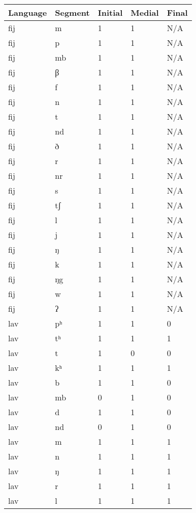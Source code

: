 \renewcommand{\arraystretch}{1.2}
\begin{longtable}{ | l | l | l | l | l | }
\hline
	Language & Segment & Initial & Medial & Final \\ \hline
	fij & m & 1 & 1 & N/A \\ \hline
	fij & p & 1 & 1 & N/A \\ \hline
	fij & mb & 1 & 1 & N/A \\ \hline
	fij & β & 1 & 1 & N/A \\ \hline
	fij & f & 1 & 1 & N/A \\ \hline
	fij & n & 1 & 1 & N/A \\ \hline
	fij & t & 1 & 1 & N/A \\ \hline
	fij & nd & 1 & 1 & N/A \\ \hline
	fij & ð & 1 & 1 & N/A \\ \hline
	fij & r & 1 & 1 & N/A \\ \hline
	fij & nr & 1 & 1 & N/A \\ \hline
	fij & s & 1 & 1 & N/A \\ \hline
	fij & tʃ & 1 & 1 & N/A \\ \hline
	fij & l & 1 & 1 & N/A \\ \hline
	fij & j & 1 & 1 & N/A \\ \hline
	fij & ŋ & 1 & 1 & N/A \\ \hline
	fij & k & 1 & 1 & N/A \\ \hline
	fij & ŋg & 1 & 1 & N/A \\ \hline
	fij & w & 1 & 1 & N/A \\ \hline
	fij & ʔ & 1 & 1 & N/A \\ \hline
	lav & pʰ & 1 & 1 & 0 \\ \hline
	lav & tʰ & 1 & 1 & 1 \\ \hline
	lav & t & 1 & 0 & 0 \\ \hline
	lav & kʰ & 1 & 1 & 1 \\ \hline
	lav & b & 1 & 1 & 0 \\ \hline
	lav & mb & 0 & 1 & 0 \\ \hline
	lav & d & 1 & 1 & 0 \\ \hline
	lav & nd & 0 & 1 & 0 \\ \hline
	lav & m & 1 & 1 & 1 \\ \hline
	lav & n & 1 & 1 & 1 \\ \hline
	lav & ŋ & 1 & 1 & 1 \\ \hline
	lav & r & 1 & 1 & 1 \\ \hline
	lav & l & 1 & 1 & 1 \\ \hline

\end{longtable}
